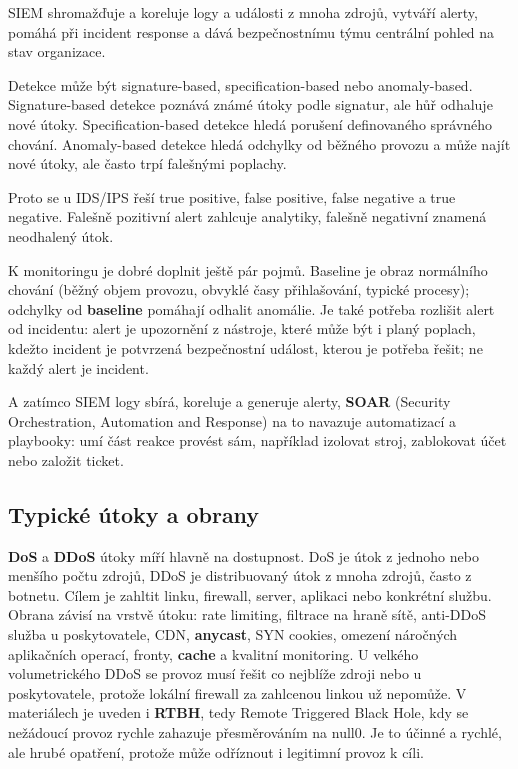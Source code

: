 \documentclass[11pt,a4paper]{article}
\begin{document}
SIEM shromažďuje a koreluje logy a události z mnoha zdrojů, vytváří alerty, pomáhá při incident response a dává bezpečnostnímu týmu centrální pohled na stav organizace.

Detekce může být signature-based, specification-based nebo anomaly-based. Signature-based detekce poznává známé útoky podle signatur, ale hůř odhaluje nové útoky. Specification-based detekce hledá porušení definovaného správného chování. Anomaly-based detekce hledá odchylky od běžného provozu a může najít nové útoky, ale často trpí falešnými poplachy.

Proto se u IDS/IPS řeší true positive, false positive, false negative a true negative. Falešně pozitivní alert zahlcuje analytiky, falešně negativní znamená neodhalený útok.

K monitoringu je dobré doplnit ještě pár pojmů. Baseline je obraz normálního chování (běžný objem provozu, obvyklé časy přihlašování, typické procesy); odchylky od \textbf{baseline} pomáhají odhalit anomálie. Je také potřeba rozlišit alert od incidentu: alert je upozornění z nástroje, které může být i planý poplach, kdežto incident je potvrzená bezpečnostní událost, kterou je potřeba řešit; ne každý alert je incident.

A zatímco SIEM logy sbírá, koreluje a generuje alerty, \textbf{SOAR} (Security Orchestration, Automation and Response) na to navazuje automatizací a playbooky: umí část reakce provést sám, například izolovat stroj, zablokovat účet nebo založit ticket.

\subsection*{Typické útoky a obrany}

\textbf{DoS} a \textbf{DDoS} útoky míří hlavně na dostupnost. DoS je útok z jednoho nebo menšího počtu zdrojů, DDoS je distribuovaný útok z mnoha zdrojů, často z botnetu. Cílem je zahltit linku, firewall, server, aplikaci nebo konkrétní službu. Obrana závisí na vrstvě útoku: rate limiting, filtrace na hraně sítě, anti-DDoS služba u poskytovatele, CDN, \textbf{anycast}, SYN cookies, omezení náročných aplikačních operací, fronty, \textbf{cache} a kvalitní monitoring. U velkého volumetrického DDoS se provoz musí řešit co nejblíže zdroji nebo u poskytovatele, protože lokální firewall za zahlcenou linkou už nepomůže. V materiálech je uveden i \textbf{RTBH}, tedy Remote Triggered Black Hole, kdy se nežádoucí provoz rychle zahazuje přesměrováním na null0. Je to účinné a rychlé, ale hrubé opatření, protože může odříznout i legitimní provoz k cíli.
\end{document}
